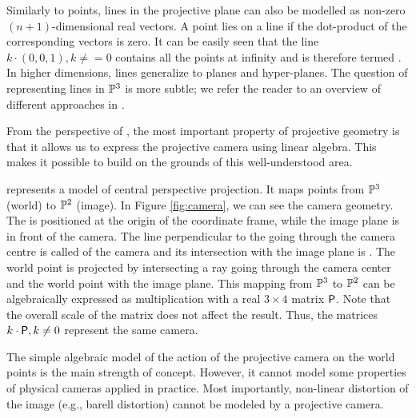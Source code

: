 Similarly to points, lines in the projective plane can also be modelled as non-zero $(n + 1)$-dimensional real vectors. 
A point lies on a line if the dot-product of the corresponding vectors is zero. 
It can be easily seen that the line $k \cdot (0, 0, 1), k \neq = 0$ contains all the points at infinity and is therefore termed . 
In higher dimensions, lines generalize to planes and hyper-planes. 
The question of representing lines in $\P^3$ is more subtle; we refer the reader to an overview of different approaches in \cite{multipleview}. %

From the perspective of \cv, the most important property of projective geometry is that it allows us to express the projective camera using linear algebra. 
This makes it possible to build on the grounds of this well-understood area.

 represents a model of central perspective projection.
It maps points from $\P^3$ (world) to $\P^2$ (image).
In Figure \ref{fig:camera}, we can see the camera geometry.
The  is positioned at the origin of the coordinate frame, while the image plane is in front of the camera.
The line perpendicular to the  going through the camera centre is called  of the camera and its intersection with the image plane is .
The world point is projected by intersecting a ray going through the camera center and the world point with the image plane. 
This mapping from $\P^3$ to $\P^2$ can be algebraically expressed as multiplication with a real $3 \times 4$ matrix $\Proj$. 
Note that the overall scale of the matrix does not affect the result. 
Thus, the matrices $k \cdot \Proj, k \neq 0$ represent the same camera. %

The simple algebraic model of the action of the projective camera on the world points is the main strength of concept. 
However, it cannot model some properties of physical cameras applied in practice. 
Most importantly, non-linear distortion of the image (e.g., barell distortion) cannot be modeled by a projective camera. 

